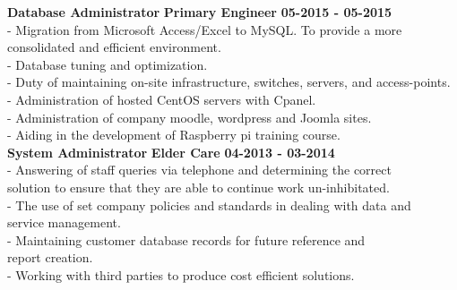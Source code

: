 \documentclass[12pt,a4paper]{article}
\begin{document}
\textbf{Database Administrator}
\hspace*{1.2cm}\textbf{Primary Engineer}
\hspace*{1.2cm}\textbf{05-2015 - 05-2015}\\
\hspace*{.5cm} - Migration from Microsoft Access/Excel to MySQL. To provide a more 
\hspace*{.7cm} consolidated and efficient environment.\\
\hspace*{.5cm} - Database tuning and optimization.\\
\hspace*{.5cm} - Duty of maintaining on-site infrastructure, switches, servers, and 
\hspace*{.7cm} access-points.\\
\hspace*{.5cm} - Administration of hosted CentOS servers with Cpanel.\\
\hspace*{.5cm} - Administration of company moodle, wordpress and Joomla sites.\\
\hspace*{.5cm} - Aiding in the development of Raspberry pi training course.\\
\textbf{System Administrator}
\hspace*{2cm}\textbf{Elder Care}
\hspace*{2cm}\textbf{04-2013 - 03-2014}\\
\hspace*{.5cm} - Answering of staff queries via telephone and determining the correct\\
\hspace*{.7cm} solution to ensure that they are able to continue work un-inhibitated.\\
\hspace*{.5cm} - The use of set company policies and standards in dealing with data and\\
\hspace*{.7cm} service management.\\
\hspace*{.5cm} - Maintaining customer database records for future reference and\\ 
\hspace*{.7cm}report creation.\\
\hspace*{.5cm} - Working with third parties to produce cost efficient solutions.\\
\end{document}
